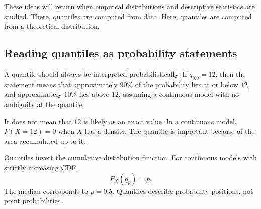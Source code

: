 These ideas will return when empirical distributions and descriptive statistics
are studied. There, quantiles are computed from data. Here, quantiles are
computed from a theoretical distribution.

\subsection*{Reading quantiles as probability statements}

A quantile should always be interpreted probabilistically. If \(q_{0.9}=12\),
then the statement means that approximately \(90\%\) of the probability lies at
or below \(12\), and approximately \(10\%\) lies above \(12\), assuming a
continuous model with no ambiguity at the quantile.

It does not mean that \(12\) is likely as an exact value. In a continuous model,
\(P(X=12)=0\) when \(X\) has a density. The quantile is important because of the
area accumulated up to it.

\begin{summarybox}
Quantiles invert the cumulative distribution function. For continuous models
with strictly increasing CDF,
\[
F_X(q_p)=p.
\]
The median corresponds to \(p=0.5\). Quantiles describe probability positions,
not point probabilities.
\end{summarybox}
